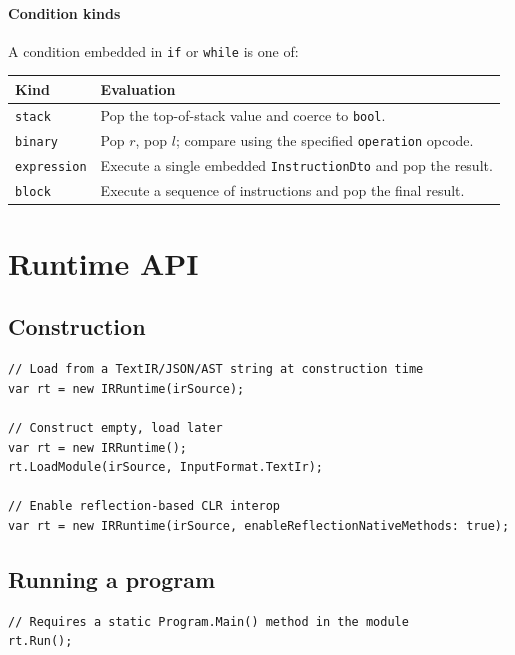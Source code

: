 \documentclass[11pt,a4paper]{article}
\begin{document}
\paragraph{Condition kinds} A condition embedded in \texttt{if} or
\texttt{while} is one of:

\begin{center}
\begin{tabular}{ll}
\toprule
\textbf{Kind}      & \textbf{Evaluation} \\
\midrule
\texttt{stack}      & Pop the top-of-stack value and coerce to \texttt{bool}. \\
\texttt{binary}     & Pop $r$, pop $l$; compare using the specified \texttt{operation} opcode. \\
\texttt{expression} & Execute a single embedded \texttt{InstructionDto} and pop the result. \\
\texttt{block}      & Execute a sequence of instructions and pop the final result. \\
\bottomrule
\end{tabular}
\end{center}

\section{Runtime API}

\subsection{Construction}

\begin{lstlisting}[language={[Sharp]C}]
// Load from a TextIR/JSON/AST string at construction time
var rt = new IRRuntime(irSource);

// Construct empty, load later
var rt = new IRRuntime();
rt.LoadModule(irSource, InputFormat.TextIr);

// Enable reflection-based CLR interop
var rt = new IRRuntime(irSource, enableReflectionNativeMethods: true);
\end{lstlisting}

\subsection{Running a program}

\begin{lstlisting}[language={[Sharp]C}]
// Requires a static Program.Main() method in the module
rt.Run();
\end{lstlisting}
\end{document}
